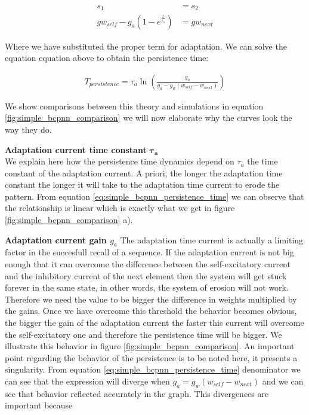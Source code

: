 \documentclass[10pt,a4paper]{article}
\begin{document}
\begin{align*}
s_1 &= s_2 \\
gw_{self} - g_{a} (1 - e^{\frac{t}{\tau_a}}) &=  g w_{next}
\end{align*}


Where we have substituted the proper term for adaptation. We can solve the equation equation above to obtain the persistence time:

\begin{align}
T_{persistence} = \tau_{a} \ln \left(\frac{g_a}{g_a - g_w (w_{self}  - w_{next})} \right) \label{eq:simple_bcpnn_persistence_time}
\end{align}

We show comparisons between this theory and simulations in equation \ref{fig:simple_bcpnn_comparison} we will now elaborate why the curves look the way they do.

\textbf{Adaptation current time constant} $\mathbf{\tau_{a}}$ \\
We explain here how the persistence time dynamics depend on $\tau_a$ the time constant of the adaptation current. A priori, the longer the adaptation time constant the longer it will take to the adaptation time current to erode the pattern. From equation \ref{eq:simple_bcpnn_persistence_time} we can observe that the relationship is linear which is exactly what we get in figure \ref{fig:simple_bcpnn_comparison} a).  

\textbf{Adaptation current gain $g_a$}
The adaptation time current is actually a limiting factor in the succesfull recall of a sequence. If the adaptation current is not big enough that it can overcome the difference between the self-excitatory current and the inhibitory current of the next element then the system will get stuck forever in the same state, in other words, the system of erosion will not work. Therefore we need the value to be bigger the difference in weights multiplied by the gains. Once we have overcome this threshold the behavior becomes obvious, the bigger the gain of the adaptation current the faster this current will overcome the self-excitatory one and therefore the persistence time will be bigger. We illustrate this behavior in figure \ref{fig:simple_bcpnn_comparison}. An important point regarding the behavior of the persistence is to be noted here, it presents a singularity. From equation \ref{eq:simple_bcpnn_persistence_time} denominator we can see that the expression will diverge when $g_a = g_w (w_{self} - w_{next})$ and we can see that behavior reflected accurately in the graph. This divergences are important because 
\end{document}
